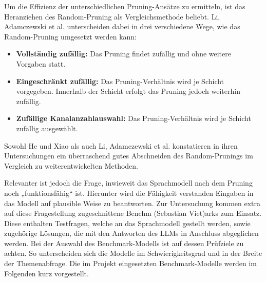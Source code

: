Um die Effizienz der unterschiedlichen Pruning-Ansätze zu ermitteln, ist das
Heranziehen des Random-Pruning als Vergleichsmethode beliebt. Li, Adamczewski
et al. unterscheiden dabei in drei verschiedene Wege, wie das Random-Pruning
umgesetzt werden kann:

\begin{itemize}
	\item \textbf{Vollständig zufällig:} Das Pruning findet zufällig und ohne weitere Vorgaben statt.
	\item \textbf{Eingeschränkt zufällig:} Das Pruning-Verhältnis wird je Schicht vorgegeben. Innerhalb der Schicht erfolgt das Pruning jedoch weiterhin zufällig.
	\item \textbf{Zufällige Kanalanzahlauswahl:} Das Pruning-Verhältnis wird je Schicht zufällig ausgewählt.\autocite[Vgl.][]{li2022random}
\end{itemize}

Sowohl He und Xiao als auch Li, Adamczewski et al. konstatieren in ihren
Untersuchungen ein überraschend gutes Abschneiden des Random-Prunings im
Vergleich zu weiterentwickelten Methoden.\autocites[Vgl.][]{he2023structured}{li2022random}

Relevanter ist jedoch die Frage, inwieweit das Sprachmodell nach dem Pruning
noch „funktionsfähig“ ist. Hierunter wird die Fähigkeit verstanden Eingaben in
das Modell auf plausible Weise zu beantworten. Zur Untersuchung kommen extra
auf diese Fragestellung zugeschnittene Benchm (Sebastian Viet)arks zum Einsatz. Diese enthalten
Testfragen, welche an das Sprachmodell gestellt werden, sowie zugehörige
Lösungen, die mit den Antworten des LLMs in Anschluss abgeglichen werden. Bei
der Auswahl des Benchmark-Modells ist auf dessen Prüfziele zu achten. So
unterscheiden sich die Modelle im Schwierigkeitsgrad und in der Breite der
Themenabfrage. Die im Projekt eingesetzten Benchmark-Modelle werden im
Folgenden kurz vorgestellt.


